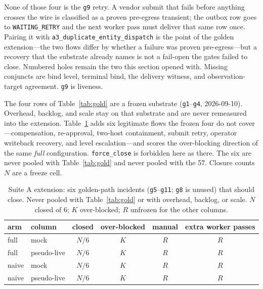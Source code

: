 None of those four is the \texttt{g9} retry. A vendor submit that
fails before anything crosses the wire is classified as a proven
pre-egress transient; the outbox row goes to \texttt{WAITING\_RETRY}
and the next worker pass must deliver that same row once. Pairing it
with \texttt{a3\_duplicate\_entity\_dispatch} is the point of the
golden extension---the two flows differ by whether a failure was
proven pre-egress---but a recovery that the substrate already names is
not a fail-open the gates failed to close. Numbered holes remain the
two this section opened with. Missing conjuncts are bind level,
terminal bind, the delivery witness, and observation-target agreement.
\texttt{g9} is liveness.


The four rows of Table~\ref{tab:gold} are a frozen substrate
(\texttt{g1}--\texttt{g4}, 2026-09-10). Overhead, backlog, and scale
stay on that substrate and are never remeasured into the extension.
Table~\ref{tab:gold-ext} adds six legitimate flows the frozen four do
not cover---compensation, re-approval, two-host containment, submit
retry, operator writeback recovery, and level escalation---and scores
the over-blocking direction of the same \emph{full} configuration.
\texttt{force\_close} is forbidden here as there. The six are never
pooled with Table~\ref{tab:gold} and never pooled with the 57. Closure
counts $N$ are a freeze cell.

\begin{table}
\centering
\small
\caption{Suite A extension: six golden-path incidents
(\texttt{g5}--\texttt{g11}; \texttt{g8} is unused) that should close.
Never pooled with Table~\ref{tab:gold} or with overhead, backlog, or
scale. $N$ closed of 6; $K$ over-blocked; $R$ unfrozen for the other
columns.}
\label{tab:gold-ext}
\begin{tabular}{@{}llcccc@{}}
\hline
arm & column & closed & over-blocked & manual & extra worker passes \\
\hline
full  & mock         & $N/6$ & $K$ & $R$ & $R$ \\
full  & pseudo-live  & $N/6$ & $K$ & $R$ & $R$ \\
naive & mock         & $N/6$ & $K$ & $R$ & $R$ \\
naive & pseudo-live  & $N/6$ & $K$ & $R$ & $R$ \\
\hline
\end{tabular}
\end{table}

